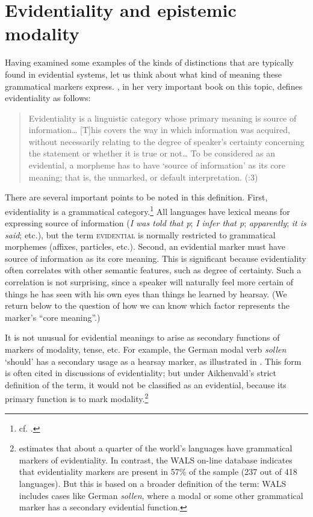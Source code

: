 \section{Evidentiality and epistemic modality}\label{sec:17.3}

Having examined some examples of the kinds of distinctions that are typically found in evidential systems, let us think about what kind of meaning these grammatical markers express. \citet{Aikhenvald2004}, in her very important book on this topic, defines evidentiality as follows:


\begin{quote}
Evidentiality is a linguistic category whose primary meaning is source of information… [T]his covers the way in which information was acquired, without necessarily relating to the degree of speaker’s certainty concerning the statement or whether it is true or not… To be considered as an evidential, a morpheme has to have ‘source of information’ as its core meaning; that is, the unmarked, or default interpretation.  (\citealt{Aikhenvald2004}:3)
\end{quote}


There are several important points to be noted in this definition. First, evidentiality is a grammatical category.\footnote{cf. \citet[1]{Aikhenvald2004}.} All languages have lexical means for expressing source of information (\textit{I was told that p}; \textit{I infer that p}; \textit{apparently}; \textit{it is said}; etc.), but the term \textsc{evidential} is normally restricted to grammatical morphemes (affixes, particles, etc.). Second, an evidential marker must have source of information as its core meaning. This is significant because evidentiality often correlates with other semantic features, such as degree of certainty. Such a correlation is not surprising, since a speaker will naturally feel more certain of things he has seen with his own eyes than things he learned by hearsay. (We return below to the question of how we can know which factor represents the marker’s “core meaning”.)



It is not unusual for evidential meanings to arise as secondary functions of markers of modality, tense, etc. For example, the German modal verb \textit{sollen} ‘should’ has a secondary usage as a hearsay marker, as illustrated in . This form is often cited in discussions of evidentiality; but under Aikhenvald’s strict definition of the term, it would not be classified as an evidential, because its primary function is to mark modality.\footnote{\citet[1]{Aikhenvald2004} estimates that about a quarter of the world’s languages have grammatical markers of evidentiality. In contrast, the WALS on-line database indicates that evidentiality markers are present in 57\% of the sample (237 out of 418 languages). But this is based on a broader definition of the term: WALS includes cases like German \textit{sollen}, where a modal or some other grammatical marker has a secondary evidential function.}



